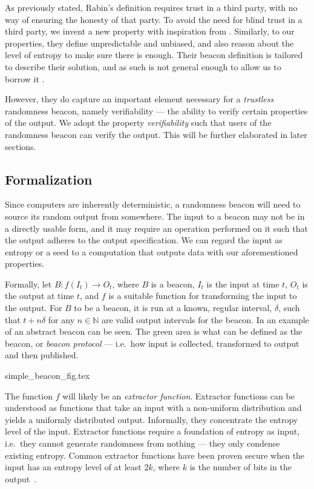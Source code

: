 As previously stated, Rabin's definition requires trust in a third party, with no way of ensuring the honesty of that party.
To avoid the need for blind trust in a third party, we invent a new property with inspiration from \citet{bonneau2015bitcoin}.
Similarly, to our properties, they define unpredictable and unbiased, and also reason about the level of entropy to make sure there is enough.
Their beacon definition is tailored to describe their solution, and as such is not general enough to allow us to borrow it%
.

However, they do capture an important element necessary for a \emph{trustless} randomness beacon, namely verifiability --- the ability to verify certain properties of the output.
We adopt the property \emph{verifiability} such that users of the randomness beacon can verify the output. This will be further elaborated in later sections.

\subsection{Formalization}
Since computers are inherently deterministic, a randomness beacon will need to source its random output from somewhere.
The input to a beacon may not be in a directly usable form, and it may require an operation performed on it such that the output adheres to the output specification.
We can regard the input as entropy or a seed to a computation that outputs data with our aforementioned properties.

Formally, let $B: f(I_t) \rightarrow O_t$, where $B$ is a beacon, $I_t$ is the input at time $t$, $O_t$ is the output at time $t$, and $f$ is a suitable function for transforming the input to the output.
For $B$ to be a beacon, it is run at a known, regular interval, $\delta$, such that $t+n\delta$ for any $n \in \mathbb{N}$ are valid output intervals for the beacon.
In  an example of an abstract beacon can be seen.
The green area is what can be defined as the beacon, or \emph{beacon protocol} --- i.e.\ how input is collected, transformed to output and then published.

{simple_beacon_fig.tex}

The function $f$ will likely be an \emph{extractor function}.
Extractor functions can be understood as functions that take an input with a non-uniform distribution and yields a uniformly distributed output.
Informally, they concentrate the entropy level of the input.
Extractor functions require a foundation of entropy as input, i.e.\ they cannot generate randomness from nothing --- they only condense existing entropy.
Common extractor functions have been proven secure when the input has an entropy level of at least $2k$, where $k$ is the number of bits in the output~\cite{dodis2004randomness}.
